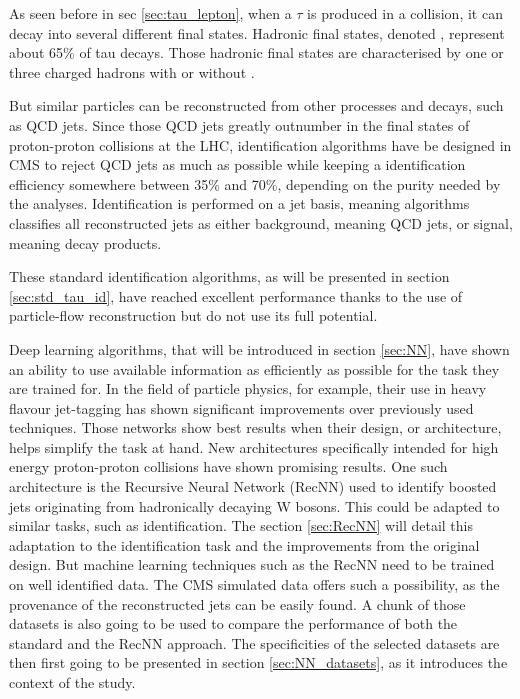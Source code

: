 
As seen before in sec \ref{sec:tau_lepton}, when a $\tau$ is produced in a collision, it can decay into several different final states.
Hadronic final states, denoted \tauh, represent about 65\% of tau decays.
Those hadronic final states are characterised by one or three charged hadrons with or without \pizero .

But similar particles can be reconstructed from other processes and decays, such as QCD jets.
Since those QCD jets greatly outnumber \tauh in the final states of proton-proton collisions at the LHC, \tauh identification algorithms have be designed in CMS to reject QCD jets as much as possible while keeping a \tauh identification efficiency somewhere between 35\% and 70\%, depending on the purity needed by the analyses. Identification is performed on a jet basis, meaning algorithms classifies all reconstructed jets as either background, meaning QCD jets, or signal, meaning \tauh decay products.

These standard \tauh identification algorithms, as will be presented in section \ref{sec:std_tau_id}, have reached excellent performance thanks to the use of particle-flow reconstruction but do not use its full potential.

Deep learning algorithms, that will be introduced in section \ref{sec:NN}, have shown an ability to use available information as efficiently as possible for the task they are trained for. In the field of particle physics, for example, their use in heavy flavour jet-tagging \cite{btagging_NN} has shown significant improvements over previously used techniques. Those networks show best results when their design, or architecture, helps simplify the task at hand. New architectures specifically intended for high energy proton-proton collisions have shown promising results. One such architecture is the Recursive Neural Network (RecNN) \cite{Louppe:2017ipp} used to identify boosted jets originating from hadronically decaying W bosons. This could be adapted to similar tasks, such as \tauh identification. The section \ref{sec:RecNN} will detail this adaptation to the \tauh identification task and the improvements from the original design. But machine learning techniques such as the RecNN need to be trained on well identified data. The CMS simulated data offers such a possibility, as the provenance of the reconstructed jets can be easily found. A chunk of those datasets is also going to be used to compare the performance of both the standard and the RecNN approach. The specificities of the selected datasets are then first going to be presented in section \ref{sec:NN_datasets}, as it introduces the context of the study.

